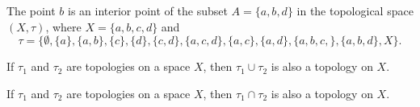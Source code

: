 	\item The point $b$ is an interior point of the subset $A = \{a,b,d\}$ in the topological space $(X,\tau)$, where $X = \{a,b,c,d\}$ and 
\[\tau = \{\emptyset, \{a\}, \{a,b\}, \{c\}, \{d\}, \{c,d\}, \{a,c,d\}, \{a,c\}, \{a,d\}, \{a,b,c,\}, \{a,b,d\}, X\}.\]

	\item If $\tau_1$ and $\tau_2$ are topologies on a space $X$, then $\tau_1 \cup \tau_2$ is also a topology on $X$.  
	
	\item If $\tau_1$ and $\tau_2$ are topologies on a space $X$, then $\tau_1 \cap \tau_2$ is also a topology on $X$.
	
	\ea

\begin{comment}

\ExerciseSolution

\ba

	\item This statement is true. By definition, $\tau$ contains $\emptyset$ and $X$. The unions of the non-trivial sets in $\tau$ are 
	\[\{a,b\} \cup \{a,b,d,f\} = \{a,b,d,f\}, \{d,f\} \cup \{a,b,d,f\} = \{a,b,d,f\}, \text{ and } \{a,b\} \cup \{d,f\} = \{a,b,d,f\},\]
	and these unions are all in $\tau$. It is also the case that the intersections 
	\[\{a,b\} \cap \{a,b,d,f\} = \{a,b\}, \{d,f\} \cap \{a,b,d,f\} = \{d,f\}, \text{ and } \{a,b\} \cap \{d,f\} = \emptyset,\]
	of the non-trivial sets in $\tau$ are also in $\tau$. 
	
	\item  This statement is false since $\R \setminus \Z$ is not finite. 
	
	\item This statement is true. By inspection we can see that every element in $X$ is an element of some set in $\mathcal{B}$. Letting $B_1 = \{b\}$, $B_2 = \{c\}$, $B_3 = \{a,b\}$, and $B_4 = \{b,c,d\}$, we have that the intersections of the sets in $\mathcal{B}$ are 
	\begin{align*}
	B_1 \cap B_2 &= B_2 \cap B_3 = \emptyset, \\
	B_1 \cap B_i &= \{b\}, \text{ where } 3 \leq i \leq 4, \\
	B_2 \cap B_4 &= \{c\}, \text{ and } \\
	B_3 \cap B_4 &= \{b\}.
	\end{align*}
The only elements in $X$ that are in $B_i \cap B_j$ for some $i$ and $j$ are $b$ and $c$. But then either $B_1$ or $B_2$ is a subset of $B_i \cap B_j$. We conclude that $\mathcal{B}$ is a basis for $\tau$. 


\end{comment}
